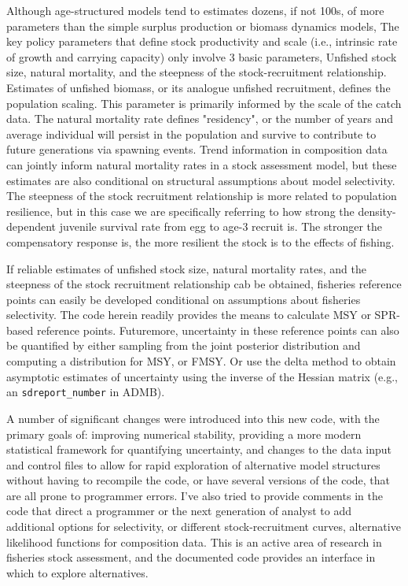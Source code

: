 \documentclass[12pt,letterpaper]{article}
\begin{document}
  Although age-structured models tend to estimates dozens, if not 100s, of more parameters than the simple surplus production or biomass dynamics models, The key policy parameters that define stock productivity and scale (i.e., intrinsic rate of growth and carrying capacity) only involve 3 basic parameters, Unfished stock size, natural mortality, and the steepness of the stock-recruitment relationship.  Estimates of unfished biomass, or its analogue unfished recruitment, defines the population scaling. This parameter is primarily informed by the scale of the catch data.  The natural mortality rate defines "residency", or the number of years and average individual will persist in the population and survive to contribute to future generations via spawning events.  Trend information in composition data can jointly inform natural mortality rates in a stock assessment model, but these estimates are also conditional on structural assumptions about model selectivity.  The steepness of the stock recruitment relationship is more related to population resilience, but in this case we are specifically referring to how strong the density-dependent juvenile survival rate from egg to age-3 recruit is. The stronger the compensatory response is, the more resilient the stock is to the effects of fishing.

  If reliable estimates of unfished stock size,  natural mortality rates, and the steepness of the stock recruitment relationship cab be obtained, fisheries reference points can easily be developed conditional on assumptions about fisheries selectivity. The code herein readily provides the means to calculate MSY or SPR-based reference points.  Futuremore, uncertainty in these reference points can also be quantified by either sampling from the joint posterior distribution and computing a distribution for MSY, or FMSY.  Or use the delta method to obtain asymptotic estimates of uncertainty using the inverse of the Hessian matrix (e.g., an \texttt{sdreport\_number} in ADMB).

  A number of significant changes were introduced into this new code, with the primary goals of: improving numerical stability, providing a more modern statistical framework for  quantifying uncertainty, and changes to the data input and control files to allow for rapid exploration of alternative model structures without having to recompile the code, or have several versions of the code, that are all prone to programmer errors.  I've also tried to provide comments in the code that direct a programmer or the next generation of analyst to add additional options for selectivity, or different stock-recruitment curves, alternative likelihood functions for composition data.  This is an active area of research in fisheries stock assessment, and the documented code provides an interface in which to explore alternatives.
\end{document}
